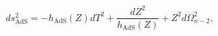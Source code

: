 \begin{equation}
ds^2_\textrm{AdS}=-h_\textrm{AdS}(Z)
dT^2+\frac{dZ^2}{h_\textrm{AdS}(Z)}+Z^2 d\Omega_{n-2}^2,
\end{equation}

